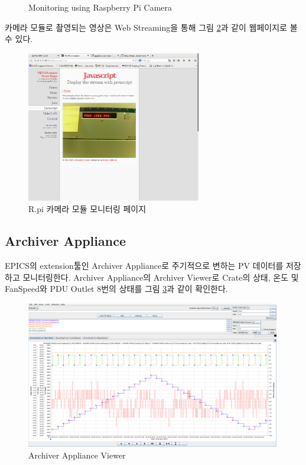 \documentclass[11pt
  , a4paper
  , article
  , oneside
]{memoir}
\begin{document}
\begin{figure}[!h]
  \centering
              \hfill
              \hfill
  \caption
      {
Monitoring using Raspberry Pi Camera
      }
 \label{fig:rpimonitoring}
\end{figure}

카메라 모듈로 촬영되는 영상은 Web Streaming을 통해 그림 \ref{fig:javapage}과 같이 웹페이지로 볼 수 있다. 

\begin{figure}[h!]
  \centering
  \includegraphics[width=0.68\textwidth]{./images/javapage.eps}
  \caption{R.pi 카메라 모듈 모니터링 페이지}
  \label{fig:javapage}   
\end{figure}

\subsection{Archiver Appliance}
EPICS의 extension툴인 Archiver Appliance로 주기적으로 변하는 PV 데이터를 저장하고 모니터링한다. Archiver Appliance의 Archiver Viewer로 Crate의 상태, 온도 및 FanSpeed와 PDU Outlet 8번의 상태를 그림 \ref{fig:aaviewer}과 같이 확인한다.

\begin{figure}[h!]
  \centering
  \includegraphics[width=0.99\textwidth]{./images/aaviewer_2.eps}
  \caption{Archiver Appliance Viewer}
  \label{fig:aaviewer}   
\end{figure}
\end{document}
